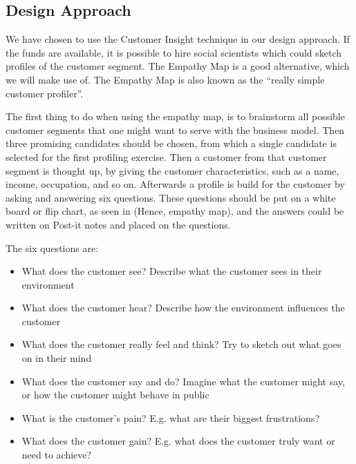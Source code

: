 \subsection{Design Approach}
\label{sec:design_approach}
We have chosen to use the Customer Insight\cite[p. 127-133]{canvas} technique in our design approach. If the funds are available, it is possible to hire social scientists which could sketch profiles of the customer segment. The Empathy Map is a good alternative, which we will make use of. The Empathy Map is also known as the ``really simple customer profiler''\cite[p. 131]{canvas}.

The first thing to do when using the empathy map, is to brainstorm all possible customer segments that one might want to serve with the business model. Then three promising candidates should be chosen, from which a single candidate is selected for the first profiling exercise. Then a customer from that customer segment is thought up, by giving the customer characteristics, such as a name, income, occupation, and so on. Afterwards a profile is build for the customer by asking and answering six questions\cite[p. 131]{canvas}. These questions should be put on a white board or flip chart, as seen in (Hence, empathy map), and the answers could be written on Post-it notes and placed on the questions.

The six questions are:
\begin{itemize}
\item What does the customer see? Describe what the customer sees in their environment
\item What does the customer hear? Describe how the environment influences the customer
\item What does the customer really feel and think? Try to sketch out what goes on in their mind
\item What does the customer say and do? Imagine what the customer might say, or how the customer might behave in public
\item What is the customer's pain? E.g. what are their biggest frustrations?
\item What does the customer gain? E.g. what does the customer truly want or need to achieve?
\end{itemize}

